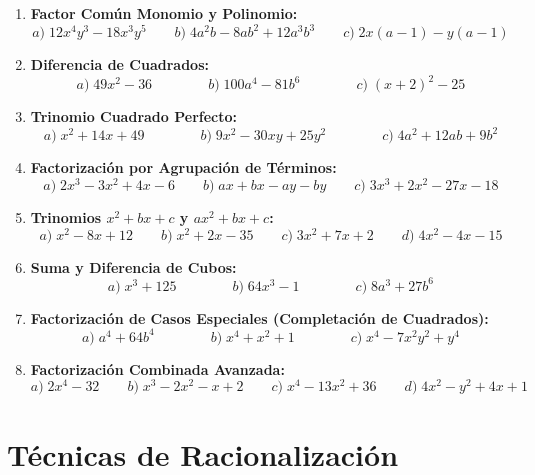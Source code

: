 \documentclass[12pt, letterpaper]{article}
\begin{document}
\begin{enumerate}[resume=ejercicios, leftmargin=*]
      \item \facil{} \textbf{Factor Común Monomio y Polinomio:}
            $$a)\; 12x^4 y^3 - 18x^3 y^5 \qquad b)\; 4a^2 b - 8ab^2 + 12a^3 b^3 \qquad c)\; 2x(a - 1) - y(a - 1)$$

      \item \facil{} \textbf{Diferencia de Cuadrados:}
            $$a)\; 49x^2 - 36 \qquad\qquad b)\; 100a^4 - 81b^6 \qquad\qquad c)\; (x + 2)^2 - 25$$

      \item \facil{} \textbf{Trinomio Cuadrado Perfecto:}
            $$a)\; x^2 + 14x + 49 \qquad\qquad b)\; 9x^2 - 30xy + 25y^2 \qquad\qquad c)\; 4a^2 + 12ab + 9b^2$$

      \item \medio{} \textbf{Factorización por Agrupación de Términos:}
            $$a)\; 2x^3 - 3x^2 + 4x - 6 \qquad b)\; ax + bx - ay - by \qquad c)\; 3x^3 + 2x^2 - 27x - 18$$

      \item \medio{} \textbf{Trinomios $x^2 + bx + c$ y $ax^2 + bx + c$:}
            $$a)\; x^2 - 8x + 12 \qquad b)\; x^2 + 2x - 35 \qquad c)\; 3x^2 + 7x + 2 \qquad d)\; 4x^2 - 4x - 15$$

      \item \medio{} \textbf{Suma y Diferencia de Cubos:}
            $$a)\; x^3 + 125 \qquad\qquad b)\; 64x^3 - 1 \qquad\qquad c)\; 8a^3 + 27b^6$$

      \item \dificil{} \textbf{Factorización de Casos Especiales (Completación de Cuadrados):}
            $$a)\; a^4 + 64b^4 \qquad\qquad b)\; x^4 + x^2 + 1 \qquad\qquad c)\; x^4 - 7x^2 y^2 + y^4$$

      \item \dificil{} \textbf{Factorización Combinada Avanzada:}
            $$a)\; 2x^4 - 32 \qquad b)\; x^3 - 2x^2 - x + 2 \qquad c)\; x^4 - 13x^2 + 36 \qquad d)\; 4x^2 - y^2 + 4x + 1$$
\end{enumerate}


\section{Técnicas de Racionalización}
\end{document}
